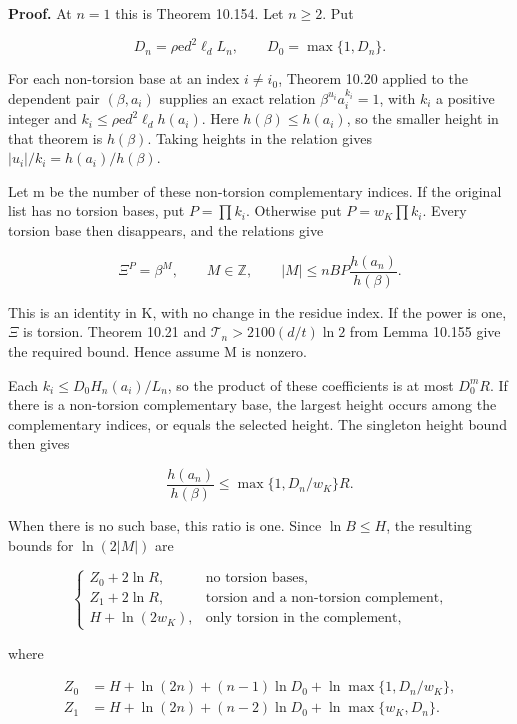 \documentclass[
  11pt,
  a4paper,
]{article}
\begin{document}
\textbf{Proof.} At \(n=1\) this is Theorem 10.154. Let \(n\ge2\). Put

\[
D_n=\rho\mathrm e d^2\ell_dL_n,
\qquad D_0=\max\{1,D_n\}.
\tag{10.498}
\]

For each non-torsion base at an index \(i\ne i_0\), Theorem 10.20
applied to the dependent pair \((\beta,a_i)\) supplies an exact relation
\(\beta^{u_i}a_i^{k_i}=1\), with \(k_i\) a positive integer and
\(k_i\le\rho\mathrm e d^2\ell_dh(a_i)\). Here \(h(\beta)\le h(a_i)\), so
the smaller height in that theorem is \(h(\beta)\). Taking heights in
the relation gives \(|u_i|/k_i=h(a_i)/h(\beta)\).

Let m be the number of these non-torsion complementary indices. If the
original list has no torsion bases, put \(P=\prod k_i\). Otherwise put
\(P=w_K\prod k_i\). Every torsion base then disappears, and the
relations give

\[
\Xi^P=\beta^M,
\qquad M\in\mathbb Z,
\qquad |M|\le nBP\frac{h(a_n)}{h(\beta)}.
\tag{10.499}
\]

This is an identity in K, with no change in the residue index. If the
power is one, \(\Xi\) is torsion. Theorem 10.21 and
\(\mathcal T_n>2100(d/t)\ln2\) from Lemma 10.155 give the required
bound. Hence assume M is nonzero.

Each \(k_i\le D_0H_n(a_i)/L_n\), so the product of these coefficients is
at most \(D_0^mR\). If there is a non-torsion complementary base, the
largest height occurs among the complementary indices, or equals the
selected height. The singleton height bound then gives

\[
\frac{h(a_n)}{h(\beta)}
\le\max\{1,D_n/w_K\}R.
\tag{10.500}
\]

When there is no such base, this ratio is one. Since \(\ln B\le H\), the
resulting bounds for \(\ln(2|M|)\) are

\[
\begin{cases}
Z_0+2\ln R,&\text{no torsion bases},\\
Z_1+2\ln R,&\text{torsion and a non-torsion complement},\\
H+\ln(2w_K),&\text{only torsion in the complement},
\end{cases}
\tag{10.501}
\]

where

\[
\begin{aligned}
Z_0&=H+\ln(2n)+(n-1)\ln D_0+\ln\max\{1,D_n/w_K\},\\
Z_1&=H+\ln(2n)+(n-2)\ln D_0+\ln\max\{w_K,D_n\}.
\end{aligned}
\tag{10.502}
\]
\end{document}

